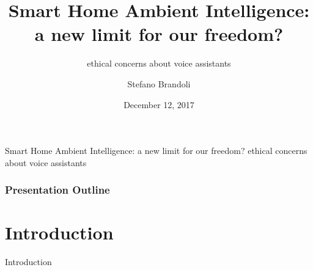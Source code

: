 \documentclass{beamer}
\title{Smart Home Ambient Intelligence: \\a new limit for our freedom?}
\subtitle{\vspace*{0.3cm}ethical concerns about voice assistants}
\author[Stefano Brandoli]{Stefano Brandoli}
\institute[PoliMi]{Politecnico di Milano}
\date{December 12, 2017}
\begin{document}
\begin{frame}
\maketitle
\end{frame}

\begin{frame}
\begin{center}\vspace*{-0.5cm}Smart Home Ambient Intelligence: a new limit for our freedom?
ethical concerns about voice assistants
\end{center}
\frametitle{Presentation Outline}
\tableofcontents
\end{frame}

\section{Introduction}

\begin{frame}
\begin{center}
	 Introduction
\end{center}
\end{frame}
\end{document}
